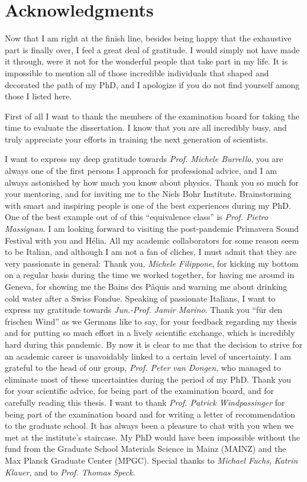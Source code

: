 \chapter*{Acknowledgments}
Now that I am right at the finish line, besides being happy that the exhaustive part is finally over, I feel a great deal of gratitude.
I would simply not have made it through, were it not for the wonderful people that take part in my life.
It is impossible to mention all of those incredible individuals that shaped and decorated the path of my PhD, and I apologize if you do not find yourself among those I listed here.

First of all I want to thank the members of the examination board for taking the time to evaluate the dissertation.
I know that you are all incredibly busy, and truly appreciate your efforts in training the next generation of scientists.

I want to express my deep gratitude towards {\it Prof. Michele Burrello}, you are always one of the first persons I approach for professional advice, and I am always astonished by how much you know about physics.
Thank you so much for your mentoring, and for inviting me to the Niels Bohr Institute.
Brainstorming with smart and inspiring people is one of the best experiences during my PhD.
One of the best example out of of this ``equivalence class'' is {\it Prof. Pietro Massignan}.
I am looking forward to visiting the post-pandemic Primavera Sound Festival with you and Hélia.
All my academic collaborators for some reason seem to be Italian, and although I am not a fan of cliches, I must admit that they are very passionate in general:
Thank you, {\it Michele Filippone}, for kicking my bottom on a regular basis during the time we worked together, for having me around in Geneva, for showing me the Bains des Pâquis and warning me about drinking cold water after a Swiss Fondue.
Speaking of passionate Italians, I want to express my gratitude towards {\it Jun.-Prof. Jamir Marino}.
Thank you ``für den frischen Wind'' as we Germans like to say, for your feedback regarding my thesis and for putting so much effort in a lively scientific exchange, which is incredibly hard during this pandemic.
By now it is clear to me that the decision to strive for an academic career is unavoidably linked to a certain level of uncertainty.
I am grateful to the head of our group, {\it Prof. Peter van Dongen}, who managed to eliminate most of these uncertainties during the period of my PhD.
Thank you for your scientific advice, for being part of the examination board, and for carefully reading this thesis.
I want to thank {\it Prof. Patrick Windpassinger} for being part of the examination board and for writing a letter of recommendation to the graduate school.
It has always been a pleasure to chat with you when we met at the institute's staircase.
My PhD would have been impossible without the fund from the Graduate School Materials Science in Mainz (MAINZ) and the Max Planck Graduate Center (MPGC).
Special thanks to {\it Michael Fuchs}, {\it Katrin Klauer}, and to {\it Prof. Thomas Speck}.

